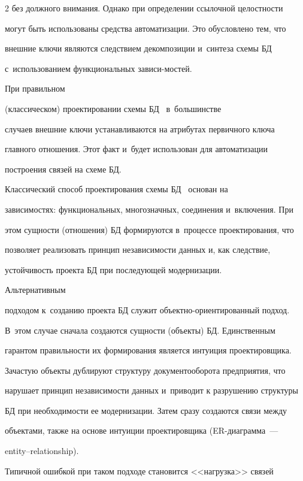 \begin{multicols}{2}
без должного внимания. Од\-нако при определении ссылочной целостности

могут быть использованы средства автоматизации. Это обусловлено тем, что

внешние ключи являются следствием декомпозиции и~синтеза схемы БД 

с~использованием функциональных зависи-\linebreak мостей. 



При правильном

(классическом) проектировании схемы БД~\cite{4-z, 3-z} в~большинстве

случаев внешние ключи устанавливаются на атрибутах первичного ключа

главного отношения. Этот факт и~будет использован для автоматизации

построения связей на схеме БД.



  Классический способ проектирования схемы БД~\cite{4-z, 3-z} основан на

зависимостях: функ\-ци\-о\-наль\-ных, многозначных, соединения и~включения. При

этом сущности (отношения) БД формируются в~процессе проектирования, что

позволяет реализовать принцип независимости данных и, как следствие,

устойчивость проекта БД при последующей модернизации. 



Альтернативным

подходом к~со\-зда\-нию проекта БД служит объект\-но-ори\-ен\-ти\-ро\-ван\-ный подход.

В~этом случае сначала создаются сущности (объекты) БД. Единственным

гарантом правильности их формирования является интуиция проектировщика.

Зачастую объекты дублируют структуру документооборота предприятия, что

нарушает принцип независимости данных и~приводит к разрушению структуры

БД при необходимости ее модернизации. Затем сразу создаются связи между

объектами, также на основе интуиции проектировщика (ER-диа\-грам\-ма~---

entity--relationship).

Типичной ошибкой при таком подходе становится <<нагрузка>> связей


\end{multicols}
